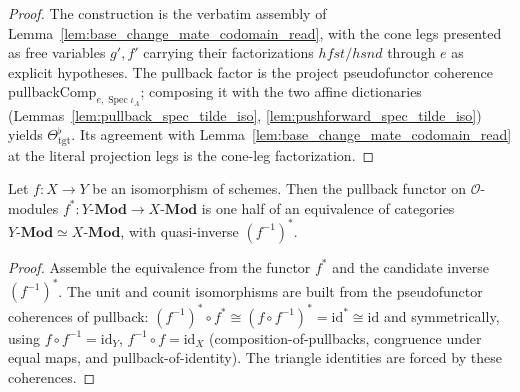 \begin{proof}
  The construction is the verbatim assembly of
  Lemma~\ref{lem:base_change_mate_codomain_read}, with the cone legs presented as free variables
  \(g', f'\) carrying their factorizations \(\mathit{hfst}/\mathit{hsnd}\) through
  \(e\) as explicit hypotheses. The pullback factor is the project pseudofunctor coherence
  \(\mathrm{pullbackComp}_{e,\operatorname{Spec}\iota_A}\); composing it with the two affine
  dictionaries (Lemmas~\ref{lem:pullback_spec_tilde_iso}, \ref{lem:pushforward_spec_tilde_iso})
  yields \(\Theta_{\mathrm{tgt}}^{\flat}\). Its agreement with
  Lemma~\ref{lem:base_change_mate_codomain_read} at the literal projection legs is the cone-leg
  factorization.
\end{proof}


\begin{lemma}
  \label{lem:pullbackIsoEquivalenceOfIso}
  Let \(f : X \to Y\) be an isomorphism of schemes. Then the pullback functor on
  \(\mathcal{O}\)-modules \(f^* : Y\text{-}\mathbf{Mod} \to X\text{-}\mathbf{Mod}\) is
  one half of an equivalence of categories
  \(Y\text{-}\mathbf{Mod} \simeq X\text{-}\mathbf{Mod}\), with quasi-inverse
  \((f^{-1})^*\).
\end{lemma}
\begin{proof}

  Assemble the equivalence from the functor \(f^*\) and the candidate inverse
  \((f^{-1})^*\). The unit and counit isomorphisms are built from the pseudofunctor
  coherences of pullback: \((f^{-1})^* \circ f^* \cong (f \circ f^{-1})^* = \mathrm{id}^*
  \cong \mathrm{id}\) and symmetrically, using
  \(f \circ f^{-1} = \mathrm{id}_Y\), \(f^{-1} \circ f = \mathrm{id}_X\)
  (composition-of-pullbacks, congruence under equal maps, and pullback-of-identity).
  The triangle identities are forced by these coherences.
\end{proof}

